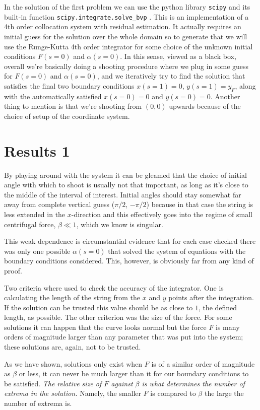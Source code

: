 \documentclass[10pt,a4paper,twocolumn]{article}
\begin{document}
In the solution of the first problem we can use the python library \texttt{scipy} and its built-in function \texttt{scipy.integrate.solve\_bvp} \cite{bvp}. This is an implementation of a 4th order collocation system with residual estimation. It actually requires an initial guess for the solution over the whole domain so to generate that we will use the Runge-Kutta 4th order integrator for some choice of the unknown initial conditions $F (s=0)$ and $\alpha (s=0)$. In this sense, viewed as a black box, overall we're basically doing a shooting procedure where we plug in some guess for $F (s=0)$ and $\alpha (s=0)$, and we iteratively try to find the solution that satisfies the final two boundary conditions $x (s=1) = 0$, $y (s=1) = y_F$, along with the automatically satisfied $x (s=0) = 0$ and $y (s=0) = 0$. Another thing to mention is that we're shooting from $(0, 0)$ upwards because of the choice of setup of the coordinate system.


\section{Results 1}

By playing around with the system it can be gleamed that the choice of initial angle with which to shoot is usually not that important, as long as it's close to the middle of the interval of interest. Initial angles should stay somewhat far away from complete vertical guess ($\pi/2$, $-\pi/2$) because in that case the string is less extended in the $x$-direction and this effectively goes into the regime of small centrifugal force, $\beta \ll 1$, which we know is singular.

This weak dependence is circumstantial evidence that for each case checked there was only one possible $\alpha(s=0)$ that solved the system of equations with the boundary conditions considered. This, however, is obviously far from any kind of proof.

Two criteria where used to check the accuracy of the integrator. One is calculating the length of the string from the $x$ and $y$ points after the integration. If the solution can be trusted this value should be as close to $1$, the defined length, as possible. The other criterion was the size of the force. For some solutions it can happen that the curve looks normal but the force $F$ is many orders of magnitude larger than any parameter that was put into the system; these solutions are, again, not to be trusted.

As we have shown, solutions only exist when $F$ is of a similar order of magnitude as $\beta$ or less, it can never be much larger than it for our boundary conditions to be satisfied. \emph{The relative size of $F$ against $\beta$ is what determines the number of extrema in the solution.} Namely, the smaller $F$ is compared to $\beta$ the large the number of extrema is.
\end{document}
